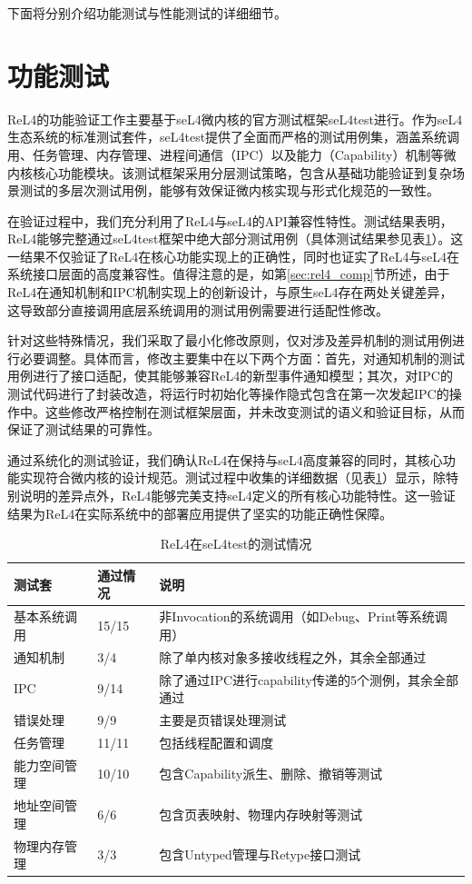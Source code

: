 下面将分别介绍功能测试与性能测试的详细细节。

\section{功能测试}
ReL4的功能验证工作主要基于seL4微内核的官方测试框架seL4test进行。作为seL4生态系统的标准测试套件，seL4test提供了全面而严格的测试用例集，涵盖系统调用、任务管理、内存管理、进程间通信（IPC）以及能力（Capability）机制等微内核核心功能模块。该测试框架采用分层测试策略，包含从基础功能验证到复杂场景测试的多层次测试用例，能够有效保证微内核实现与形式化规范的一致性。

在验证过程中，我们充分利用了ReL4与seL4的API兼容性特性。测试结果表明，ReL4能够完整通过seL4test框架中绝大部分测试用例（具体测试结果参见表\ref{tab:seL4_test_info}）。这一结果不仅验证了ReL4在核心功能实现上的正确性，同时也证实了ReL4与seL4在系统接口层面的高度兼容性。值得注意的是，如第\ref{sec:rel4_comp}节所述，由于ReL4在通知机制和IPC机制实现上的创新设计，与原生seL4存在两处关键差异，这导致部分直接调用底层系统调用的测试用例需要进行适配性修改。

针对这些特殊情况，我们采取了最小化修改原则，仅对涉及差异机制的测试用例进行必要调整。具体而言，修改主要集中在以下两个方面：首先，对通知机制的测试用例进行了接口适配，使其能够兼容ReL4的新型事件通知模型；其次，对IPC的测试代码进行了封装改造，将运行时初始化等操作隐式包含在第一次发起IPC的操作中。这些修改严格控制在测试框架层面，并未改变测试的语义和验证目标，从而保证了测试结果的可靠性。

通过系统化的测试验证，我们确认ReL4在保持与seL4高度兼容的同时，其核心功能实现符合微内核的设计规范。测试过程中收集的详细数据（见表\ref{tab:seL4_test_info}）显示，除特别说明的差异点外，ReL4能够完美支持seL4定义的所有核心功能特性。这一验证结果为ReL4在实际系统中的部署应用提供了坚实的功能正确性保障。


\begin{table}[htbp]
    \centering
    \begin{tabular*}{1.0\textwidth}{@{\extracolsep{\fill}}lll}
    \toprule
    测试套			&通过情况 &说明	 \\
    \midrule
    基本系统调用			&15/15 & 非Invocation的系统调用（如Debug、Print等系统调用） \\
      通知机制			&3/4 & 除了单内核对象多接收线程之外，其余全部通过	 \\
      IPC &9/14 & 除了通过IPC进行capability传递的5个测例，其余全部通过	 \\
      错误处理  &9/9 & 主要是页错误处理测试\\
      任务管理	&11/11 & 包括线程配置和调度 \\
      能力空间管理 &10/10 & 包含Capability派生、删除、撤销等测试\\
      地址空间管理 &6/6 & 包含页表映射、物理内存映射等测试 \\
      物理内存管理 &3/3 & 包含Untyped管理与Retype接口测试  \\
    \bottomrule
    \end{tabular*}
    \caption{ReL4在seL4test的测试情况} \label{tab:seL4_test_info}
  \end{table}

